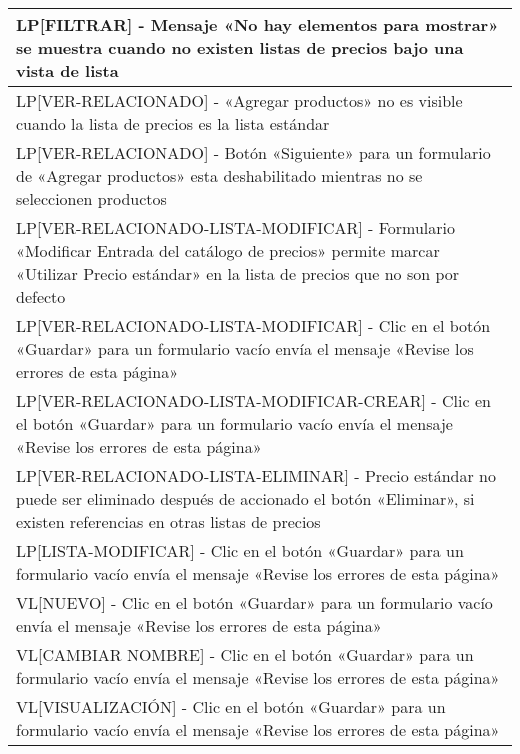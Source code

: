 \begin{longtable}{|p{15.0cm}|}
LP[FILTRAR] - Mensaje «No hay elementos para mostrar» se muestra cuando no existen listas de precios bajo una vista de lista \\ \hline
LP[VER-RELACIONADO] - «Agregar productos» no es visible cuando la lista de precios es la lista estándar \\ \hline
LP[VER-RELACIONADO] - Botón «Siguiente» para un formulario de «Agregar productos» esta deshabilitado mientras no se seleccionen productos \\ \hline
LP[VER-RELACIONADO-LISTA-MODIFICAR] - Formulario «Modificar Entrada del catálogo de precios» permite marcar «Utilizar Precio estándar» en la lista de precios que no son por defecto \\ \hline
LP[VER-RELACIONADO-LISTA-MODIFICAR] - Clic en el botón «Guardar» para un formulario vacío envía el mensaje «Revise los errores de esta página» \\ \hline
LP[VER-RELACIONADO-LISTA-MODIFICAR-CREAR] - Clic en el botón «Guardar» para un formulario vacío envía el mensaje «Revise los errores de esta página» \\ \hline
LP[VER-RELACIONADO-LISTA-ELIMINAR] - Precio estándar no puede ser eliminado después de accionado el botón «Eliminar», si existen referencias en otras listas de precios \\ \hline
LP[LISTA-MODIFICAR] - Clic en el botón «Guardar» para un formulario vacío envía el mensaje «Revise los errores de esta página» \\ \hline
VL[NUEVO] - Clic en el botón «Guardar» para un formulario vacío envía el mensaje «Revise los errores de esta página» \\ \hline
VL[CAMBIAR NOMBRE] - Clic en el botón «Guardar» para un formulario vacío envía el mensaje «Revise los errores de esta página» \\ \hline
VL[VISUALIZACIÓN] - Clic en el botón «Guardar» para un formulario vacío envía el mensaje «Revise los errores de esta página» \\ \hline
\end{longtable}

